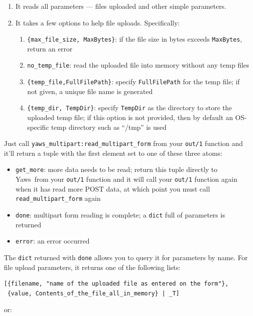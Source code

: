 \documentclass[11pt,oneside,english]{book}
\newcommand{\Yaws}            %
        {{\sc Yaws}}
\begin{document}
\begin{enumerate}
\item It reads all parameters --- files uploaded and other simple
  parameters.
\item It takes a few options to help file uploads. Specifically:
\begin{enumerate}
\item \verb+{max_file_size, MaxBytes}+: if the file size in bytes
  exceeds \verb+MaxBytes+, return an error
\item \verb+no_temp_file+: read the uploaded file into memory without
  any temp files
\item \verb+{temp_file,FullFilePath}+: specify \verb+FullFilePath+ for
  the temp file; if not given, a unique file name is generated
\item \verb+{temp_dir, TempDir}+: specify \verb+TempDir+ as the
  directory to store the uploaded temp file; if this option is not
  provided, then by default an OS-specific temp directory such as
  ``/tmp'' is used
\end{enumerate}
\end{enumerate}

Just call \verb+yaws_multipart:read_multipart_form+ from your
\verb+out/1+ function and it'll return a tuple with the first element
set to one of these three atoms:

\begin{itemize}
\item \verb+get_more+: more data needs to be read; return this tuple
  directly to \Yaws\  from your \verb+out/1+ function and it will call
  your \verb+out/1+ function again when it has read more POST data, at
  which point you must call \verb+read_multipart_form+ again
\item \verb+done+: multipart form reading is complete; a
  \verb+dict+ full of parameters is returned
\item \verb+error+: an error occurred
\end{itemize}

The \verb+dict+ returned with \verb+done+ allows you to query it for
parameters by name. For file upload parameters, it returns one of the
following lists:

\begin{verbatim}
[{filename, "name of the uploaded file as entered on the form"},
 {value, Contents_of_the_file_all_in_memory} | _T]
\end{verbatim}

or:
\end{document}
